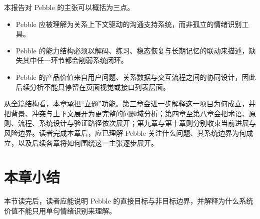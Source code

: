 本报告对 Pebble 的主张可以概括为三点。

\begin{itemize}
  \item Pebble 应被理解为关系上下文驱动的沟通支持系统，而非孤立的情绪识别工具。
  \item Pebble 的能力结构必须以解码、练习、稳态恢复与长期记忆的联动来描述，缺失其中任一环节都会削弱系统闭环。
  \item Pebble 的产品价值来自用户问题、关系数据与交互流程之间的协同设计，因此后续分析不能只停留在页面视觉或接口列表层面。
\end{itemize}

从全篇结构看，本章承担“立题”功能。第三章会进一步解释这一项目为何成立，并把背景、冲突与上下文展开为更完整的问题域分析；第四章至第八章会把术语、原则、流程、系统设计与验证路径依次展开；第九章与第十章则分别收束当前进展与风险边界。读者完成本章后，应已理解 Pebble 关注什么问题、其系统边界为何成立，以及后续各章将如何围绕这一主张逐步展开。

\section{本章小结}

本节读完后，读者应能说明 Pebble 的直接目标与非目标边界，并解释为什么系统价值不能只用单句情绪识别来理解。
